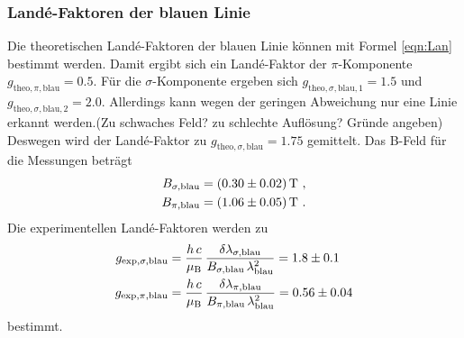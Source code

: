 \subsubsection{Landé-Faktoren der blauen Linie}
Die theoretischen Landé-Faktoren der blauen Linie können mit Formel \eqref{eqn:Lan} bestimmt werden. Damit ergibt sich ein Landé-Faktor der $\pi$-Komponente $g_{\text{theo},\pi,\text{blau}} = 0.5$. Für die $\sigma$-Komponente ergeben sich $g_{\text{theo},\sigma,\text{blau},1} = 1.5$ und $g_{\text{theo},\sigma,\text{blau},2} = 2.0$. Allerdings kann wegen der geringen Abweichung nur eine Linie erkannt werden.(Zu schwaches Feld? zu schlechte Auflösung? Gründe angeben) Deswegen wird der Landé-Faktor zu $g_{\text{theo},\sigma,\text{blau}} = 1.75$ gemittelt.
Das B-Feld für die Messungen beträgt
\begin{align*}
  B_{\sigma,\text{blau}} = (\num{0.3 +- 0.02})\, \text{T}\ , \\
  B_{\pi,\text{blau}} = (\num{1.06 +- 0.05})\, \text{T}\ .
\end{align*}
Die experimentellen Landé-Faktoren werden zu
\begin{align*}
  g_{\text{exp},\sigma,\text{blau}} &= \frac{h\,c}{\mu_\text{B}}\,\frac{\delta \lambda_{\sigma,\text{blau}}}{B_{\sigma,\text{blau}}\,\lambda_\text{blau}^2} = \num{1.8 +- 0.1} \\
  g_{\text{exp},\pi,\text{blau}} &= \frac{h\,c}{\mu_\text{B}}\,\frac{\delta \lambda_{\pi,\text{blau}}}{B_{\pi,\text{blau}}\,\lambda_\text{blau}^2} = \num{0.56 +- 0.04}
\end{align*}
bestimmt.
